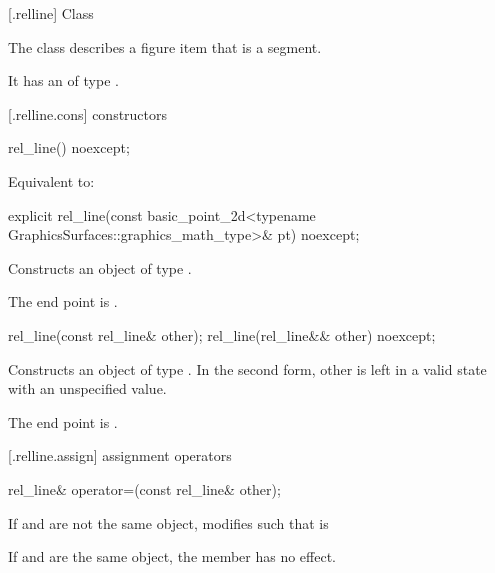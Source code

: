  [\iotwod.relline] {Class }

\pnum
{}%
The class  describes a figure item that is a segment.

\pnum
It has an  of type .

 [\iotwod.relline.cons] { constructors}

%
\begin{itemdecl}
rel_line() noexcept;
\end{itemdecl}
\begin{itemdescr}
\pnum
\effects
Equivalent to: 
\end{itemdescr}

%
\begin{itemdecl}
explicit rel_line(const basic_point_2d<typename
  GraphicsSurfaces::graphics_math_type>& pt) noexcept;
\end{itemdecl}
\begin{itemdescr}
\pnum
\effects
Constructs an object of type .

\pnum
The end point is .
\end{itemdescr}

%
\begin{itemdecl}
rel_line(const rel_line& other);
rel_line(rel_line&& other) noexcept;
\end{itemdecl}
\begin{itemdescr}
\pnum
\effects
Constructs an object of type . In the second form, other is left in a valid state with an unspecified value.

\pnum
The end point is .
\end{itemdescr}

 [\iotwod.relline.assign] { assignment operators}

%
\begin{itemdecl}
rel_line& operator=(const rel_line& other);
\end{itemdecl}
\begin{itemdescr}
\pnum
\effects
If  and  are not the same object, modifies  such that  is 

\pnum
If  and  are the same object, the member has no effect.

\pnum
\returns
{}
\end{itemdescr}

